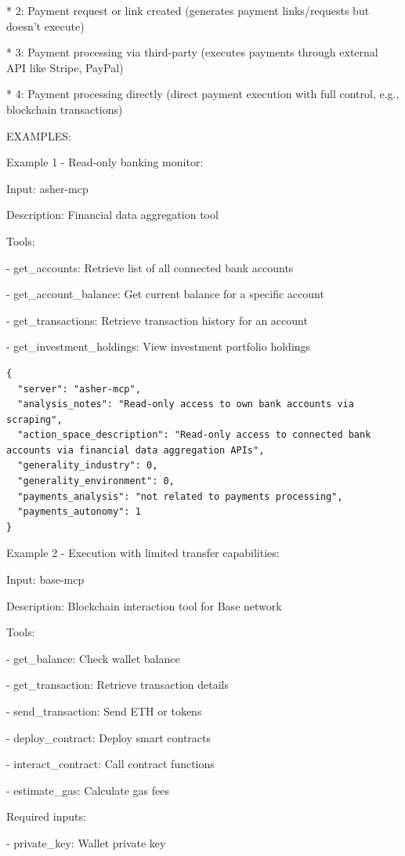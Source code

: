 \documentclass[manuscript,screen,nonacm,oneside]{acmart}
\begin{document}
* 2: Payment request or link created (generates payment links/requests but doesn't execute)

* 3: Payment processing via third-party (executes payments through external API like Stripe, PayPal)

* 4: Payment processing directly (direct payment execution with full control, e.g., blockchain transactions)

EXAMPLES:

Example 1 - Read-only banking monitor:

Input: asher-mcp

Description: Financial data aggregation tool

Tools:

- get\_accounts: Retrieve list of all connected bank accounts

- get\_account\_balance: Get current balance for a specific account

- get\_transactions: Retrieve transaction history for an account

- get\_investment\_holdings: View investment portfolio holdings

\begin{lstlisting}
{
  "server": "asher-mcp",
  "analysis_notes": "Read-only access to own bank accounts via scraping",
  "action_space_description": "Read-only access to connected bank accounts via financial data aggregation APIs",
  "generality_industry": 0,
  "generality_environment": 0,
  "payments_analysis": "not related to payments processing",
  "payments_autonomy": 1
}
\end{lstlisting}

Example 2 - Execution with limited transfer capabilities:

Input: base-mcp

Description: Blockchain interaction tool for Base network

Tools:

- get\_balance: Check wallet balance

- get\_transaction: Retrieve transaction details

- send\_transaction: Send ETH or tokens

- deploy\_contract: Deploy smart contracts

- interact\_contract: Call contract functions

- estimate\_gas: Calculate gas fees

Required inputs:

- private\_key: Wallet private key
\end{document}
